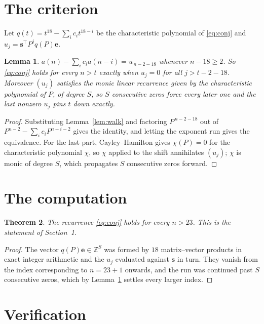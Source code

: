 \documentclass[11pt,a4paper]{article}
\theoremstyle{plain}
\newtheorem{theorem}{Theorem}
\newtheorem{lemma}[theorem]{Lemma}
\theoremstyle{definition}
\begin{document}
\section{The criterion}

Let $q(t)=t^{18}-\sum_i c_i t^{18-i}$ be the characteristic polynomial of
\eqref{eq:conj} and $u_j=\mathbf{s}^{\!\top}P^{j}q(P)\mathbf{e}$.

\begin{lemma}\label{lem:crit}
$a(n)-\sum_i c_i a(n-i)=u_{\,n-2-18}$ whenever $n-18\ge2$. So \eqref{eq:conj}
holds for every $n>t$ exactly when $u_j=0$ for all $j>t-2-18$. Moreover $(u_j)$
satisfies the monic linear recurrence given by the characteristic polynomial of $P$, of
degree $S$, so $S$ consecutive zeros force every later one and the last nonzero $u_j$ pins
$t$ down exactly.
\end{lemma}

\begin{proof}
Substituting Lemma~\ref{lem:walk} and factoring $P^{\,n-2-18}$ out of
$P^{n-2}-\sum_i c_i P^{n-i-2}$ gives the identity, and letting the exponent run gives the
equivalence. For the last part, Cayley--Hamilton gives $\chi(P)=0$ for the characteristic
polynomial $\chi$, so $\chi$ applied to the shift annihilates $(u_j)$; $\chi$ is monic of
degree $S$, which propagates $S$ consecutive zeros forward.
\end{proof}

\section{The computation}

\begin{theorem}
The recurrence \eqref{eq:conj} holds for every $n>23$. This is the statement of
Section~1.
\end{theorem}

\begin{proof}
The vector $q(P)\mathbf{e}\in\mathbb{Z}^{S}$ was formed by $18$ matrix--vector
products in exact integer arithmetic and the $u_j$ evaluated against $\mathbf{s}$ in turn.
They vanish from the index corresponding to $n=23+1$ onwards, and the run was continued
past $S$ consecutive zeros, which by Lemma~\ref{lem:crit} settles every larger index.
\end{proof}

\section{Verification}
\end{document}
